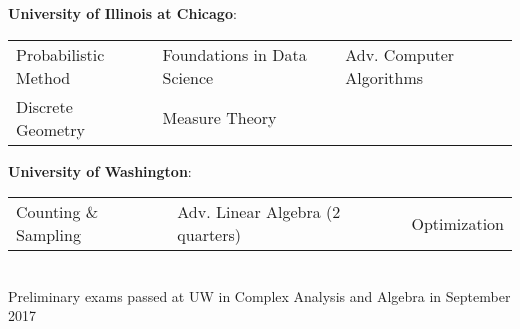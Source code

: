\documentclass[12 pt]{article}
\newcommand{\employer}[3]{{ \textbf{#1} \hfill #2\\ \textbf{#3}\\  }}
\newenvironment{achievements}{\begin{list}{$\bullet$}{\topsep 0pt \itemsep -2pt}}{\vspace*{4pt}\end{list}}
\begin{document}
\bigskip

\textbf{University of Illinois at Chicago}:\\
\smallskip
\begin{center}
	\begin{tabular}{ l l l }
		Probabilistic Method &  Foundations in Data Science & Adv. Computer Algorithms   \\ 
		Discrete Geometry &	 Measure Theory  &     \\
	\end{tabular}
\end{center}
\bigskip
 
 \textbf{University of Washington}:\\
 \smallskip
 \begin{center}
	 \begin{tabular}{ l l l }
		Counting \& Sampling &  Adv. Linear Algebra (2 quarters)   & Optimization  
	 \end{tabular}
 \end{center}\\
 \smallskip
 \scriptsize{Preliminary exams passed at UW in Complex Analysis and Algebra in September 2017}








\end{document}
